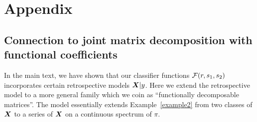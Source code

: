 \documentclass[11pt]{article}
\theoremstyle{plain}
\theoremstyle{definition}
\begin{document}






\clearpage
\section*{Appendix}
\renewcommand{\thesubsection}{\Alph{subsection}}
\setcounter{figure}{0}
\setcounter{table}{0}
\renewcommand{\thetable}{S\arabic{table}}
\renewcommand{\thefigure}{S\arabic{figure}}
\renewcommand{\figurename}{Supplemental Figure}
\renewcommand{\tablename}{Supplemental Table}


\subsection{Connection to joint matrix decomposition with functional coefficients}\label{sec:joint}
In the main text, we have shown that our classifier functions $\mathcal{F}(r,s_1,s_2)$ incorporates certain retrospective models $\bm X|y$. Here we extend the retrospective model to a more general family  which we coin as ``functionally decomposable matrices''. The model essentially extends Example~\ref{example2} from two classes of $\bm X$ to a series of $\bm X$ on a continuous spectrum of $\pi$. 
\end{document}
